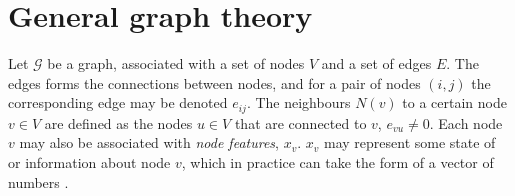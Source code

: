 






\section{General graph theory}
\label{sec:general_graph_theory}

Let $\mathcal{G}$ be a graph, associated with a set of nodes $V$ and a set of edges $E$. The edges forms the connections between nodes, and for a pair of nodes $(i,j)$ the corresponding edge may be denoted $e_{ij}$. The neighbours $N(v)$ to a certain node $v \in V$ are defined as the nodes $u \in V$ that are connected to $v$, $e_{vu} \neq 0$. Each node $v$ may also be associated with \textit{node features}, $x_v$. $x_v$ may represent some state of or information about node $v$, which in practice can take the form of a vector of numbers \cite{active_learning_node_classification}.

